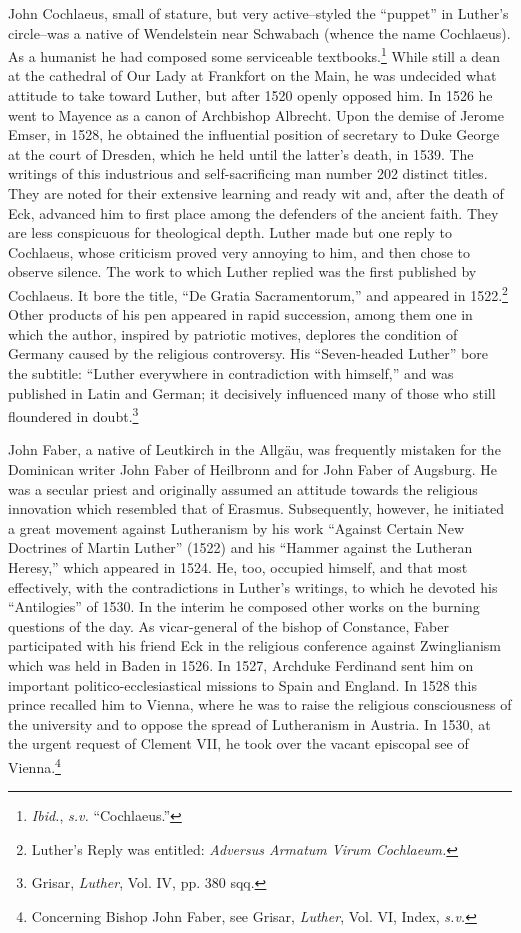 John Cochlaeus, small of stature, but very active--styled the “puppet”
in Luther’s circle--was a native of Wendelstein near Schwabach
(whence the name Cochlaeus). As a humanist he had composed some
serviceable textbooks.\footnote{\textit{Ibid.}, \textit{s.v.} “Cochlaeus.”}
While still a dean at the cathedral of Our
Lady at Frankfort on the Main, he was undecided what attitude to
take toward Luther, but after 1520 openly opposed him. In 1526 he
went to Mayence as a canon of Archbishop Albrecht. Upon the
demise of Jerome Emser, in 1528, he obtained the influential position
of secretary to Duke George at the court of Dresden, which he held
until the latter’s death, in 1539. The writings of this industrious and
self-sacrificing man number 202 distinct titles. They are noted for
their extensive learning and ready wit and, after the death of Eck,
advanced him to first place among the defenders of the ancient faith.
They are less conspicuous for theological depth. Luther made but one
reply to Cochlaeus, whose criticism proved very annoying to him,
and then chose to observe silence. The work to which Luther replied
was the first published by Cochlaeus. It bore the title, “De Gratia
Sacramentorum,” and appeared in 1522.\footnote
{Luther’s Reply was entitled: \textit{Adversus Armatum Virum Cochlaeum.}}
Other products of his pen
appeared in rapid succession, among them one in which the author,
inspired by patriotic motives, deplores the condition of Germany
caused by the religious controversy. His “Seven-headed Luther” bore
the subtitle: “Luther everywhere in contradiction with himself,”
and was published in Latin and German; it decisively influenced many
of those who still floundered in doubt.\footnote
{Grisar, \textit{Luther}, Vol. IV, pp. 380 sqq.}

John Faber, a native of Leutkirch in the Allgäu, was frequently
mistaken for the Dominican writer John Faber of Heilbronn and
for John Faber of Augsburg. He was a secular priest and originally
assumed an attitude towards the religious innovation which resembled
that of Erasmus. Subsequently, however, he initiated a great movement against
Lutheranism by his work “Against Certain New Doctrines of Martin Luther”
(1522) and his “Hammer against the Lutheran Heresy,” which appeared in
1524. He, too, occupied himself,
and that most effectively, with the contradictions in Luther’s writings,
to which he devoted his “Antilogies” of 1530. In the interim he composed
other works on the burning questions of the day. As vicar-general of the
bishop of Constance, Faber participated with his friend
Eck in the religious conference against Zwinglianism which was held
in Baden in 1526. In 1527, Archduke Ferdinand sent him on important politico-ecclesiastical
missions to Spain and England. In 1528
this prince recalled him to Vienna, where he was to raise the religious
consciousness of the university and to oppose the spread of Lutheranism
in Austria. In 1530, at the urgent request of Clement VII, he
took over the vacant episcopal see of Vienna.\footnote
{Concerning Bishop John Faber, see Grisar, \textit{Luther}, Vol. VI, Index, \textit{s.v.}}

